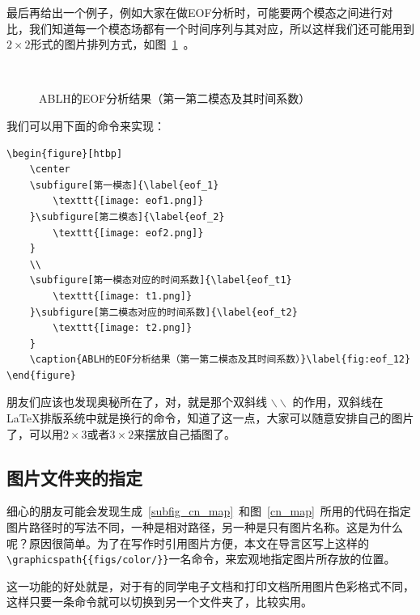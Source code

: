 最后再给出一个例子，例如大家在做EOF分析时，可能要两个模态之间进行对比，我们知道每一个模态场都有一个时间序列与其对应，所以这样我们还可能用到$2\times 2$形式的图片排列方式，如图~\ref{fig:eof_12}~。

\begin{figure}[htbp]
    \center
    \\
    \caption{ABLH的EOF分析结果（第一第二模态及其时间系数）}\label{fig:eof_12}
\end{figure}

我们可以用下面的命令来实现：

{
\color{green!50!black}
\begin{lstlisting}[breaklines=true,]
\begin{figure}[htbp]
    \center
    \subfigure[第一模态]{\label{eof_1}
        \texttt{[image: eof1.png]}
    }\subfigure[第二模态]{\label{eof_2}
        \texttt{[image: eof2.png]}
    }
    \\
    \subfigure[第一模态对应的时间系数]{\label{eof_t1}
        \texttt{[image: t1.png]}
    }\subfigure[第二模态对应的时间系数]{\label{eof_t2}
        \texttt{[image: t2.png]}
    }
    \caption{ABLH的EOF分析结果（第一第二模态及其时间系数）}\label{fig:eof_12}
\end{figure}
\end{lstlisting}
}

朋友们应该也发现奥秘所在了，对，就是那个双斜线 $\backslash\backslash$ 的作用，双斜线在\LaTeX 排版系统中就是换行的命令，知道了这一点，大家可以随意安排自己的图片了，可以用$2\times 3$或者$3\times 2$来摆放自己插图了。

\subsection{图片文件夹的指定}

细心的朋友可能会发现生成~\ref{subfig_cn_map}~和图~\ref{cn_map}~所用的代码在指定图片路径时的写法不同，一种是相对路径，另一种是只有图片名称。这是为什么呢？原因很简单。为了在写作时引用图片方便，本文在导言区写上这样的\verb|\graphicspath{{figs/color/}}|一名命令，来宏观地指定图片所存放的位置。

这一功能的好处就是，对于有的同学电子文档和打印文档所用图片色彩格式不同，这样只要一条命令就可以切换到另一个文件夹了，比较实用。
